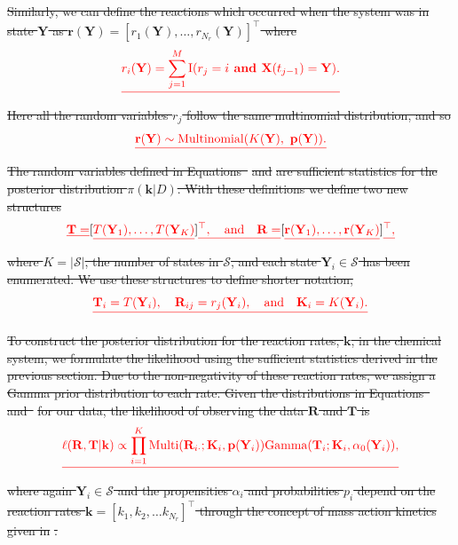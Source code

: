 \documentclass[final]{siamltex}
\providecommand{\DIFdel}[1]{{\protect\color{red}\sout{#1}}}                      %
\begin{document}
\DIFdel{Similarly, we can define the reactions which occurred when the system was in state $\mathbf{Y}$ as $\mathbf{r}(\mathbf{Y}) = [r_1(\mathbf{Y}), \ldots, r_{N_r}(\mathbf{Y})]^\top$ where
}\[
	\DIFdel{r_i(\mathbf{Y}) = \sum\limits_{j=1}^M \text{I}(r_j = i \textbf{ and }\mathbf{X}(t_{j-1}) = \mathbf{Y}).
}\]
\DIFdel{Here all the random variables $r_j$ follow the same multinomial distribution, and so
}\begin{displaymath}\DIFdel{\label{eqn:chem_react_dist}
	\mathbf{r}(\mathbf{Y}) \sim \text{Multinomial}(K(\mathbf{Y}),~\mathbf{p}(\mathbf{Y})). 
}\end{displaymath}
\DIFdel{The random variables defined in Equations~}%
\DIFdel{and }%
\DIFdel{are sufficient statistics for the posterior distribution $\pi(\mathbf{k}|D)$. With these definitions we define two new structures
}\[
	\DIFdel{\mathbf{T} = }[\DIFdel{T(\mathbf{Y}_1), \dots, T(\mathbf{Y}_K)}]\DIFdel{^\top, \quad \text{and} \quad \mathbf{R} = }[\DIFdel{\mathbf{r}(\mathbf{Y}_1), \dots, \mathbf{r}(\mathbf{Y}_K)}]\DIFdel{^\top,
}\]
\DIFdel{where $K = |\mathcal{S}|$, the number of states in $\mathcal{S}$, and each state $\mathbf{Y}_i \in \mathcal{S}$ has been enumerated. We use these structures to define shorter notation,
}\[
	\DIFdel{\mathbf{T}_i = T(\mathbf{Y}_i), \quad \mathbf{R}_{ij} = r_j(\mathbf{Y}_i), \quad \text{and} \quad \mathbf{K}_i = K(\mathbf{Y}_i).
}\]

\DIFdel{To construct the posterior distribution for the reaction rates, $\mathbf{k}$, in the chemical system, we formulate the likelihood using the sufficient statistics derived in the previous section. Due to the non-negativity of these reaction rates, we assign a Gamma prior distribution to each rate. Given the distributions in Equations~}%
\DIFdel{and~}%
\DIFdel{for our data, the likelihood of observing the data $\mathbf{R}$ and $\mathbf{T}$ is
}\[
	\DIFdel{\ell(\mathbf{R}, \mathbf{T}|\mathbf{k}) \propto \prod\limits_{i=1}^K \text{Multi}(\mathbf{R}_{i\cdot}; \mathbf{K}_i, \mathbf{p}(\mathbf{Y}_i))\text{Gamma}(\mathbf{T}_i; \mathbf{K}_i, \alpha_0(\mathbf{Y}_i)),
}\]
\DIFdel{where again $\mathbf{Y}_i \in \mathcal{S}$ and the propensities
$\alpha_i$ and probabilities $p_i$ depend on the reaction rates
$\mathbf{k} = [k_1, k_2, \ldots k_{N_r}]^\top$ through the concept of
mass action kinetics given in }%
\DIFdel{.
}%
\end{document}
